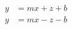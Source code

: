 \documentclass[12pt]{article}
\begin{document}
 
\begin{align*}
y &= mx + z + b \\
y &= mx - z - b
\end{align*}
\end{document}
